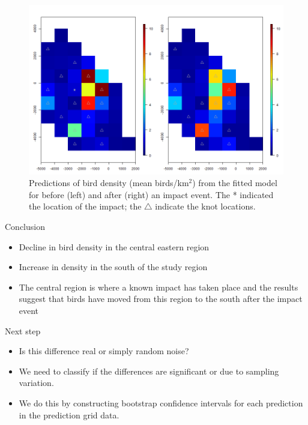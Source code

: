 \begin{figure}[h]
  \centering
  \includegraphics[width=12cm]{bc/pointEstimate.png}
  \caption{Predictions of bird density (mean birds/km$^2$) from the fitted model for before (left) and after (right) an impact event. The * indicated the location of the impact; the $\triangle$ indicate the knot locations.}
  \label{fig:nspointest}
\end{figure}
\begin{block}{Conclusion}
\begin{itemize}
  \item Decline in bird density in the central eastern region
  \item Increase in density in the south of the study region 
  \item The central region is where a known impact has taken place and the results suggest that birds have moved from this region to the south after the impact event
\end{itemize}
\end{block}

\begin{block}{Next step}
\begin{itemize}
  \item Is this difference real or simply random noise?
  \item We need to classify if the differences are significant or due to sampling variation.
  \item We do this by constructing bootstrap confidence intervals for each prediction in the prediction grid data.
\end{itemize}
\end{block}


